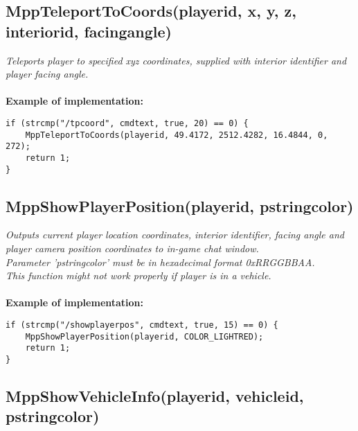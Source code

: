 \documentclass{article}
\begin{document}
\subsection{MppTeleportToCoords(playerid, x, y, z, interiorid, facingangle)}

\textit{Teleports player to specified xyz coordinates, supplied with interior identifier and player facing angle.}
\\
\\
\textbf{Example of implementation:}
\begin{verbatim}
if (strcmp("/tpcoord", cmdtext, true, 20) == 0) {
    MppTeleportToCoords(playerid, 49.4172, 2512.4282, 16.4844, 0, 272);
    return 1;
}
\end{verbatim}


\newpage
\subsection{MppShowPlayerPosition(playerid, pstringcolor)}

\textit{Outputs current player location coordinates, interior identifier, facing angle and player camera position coordinates to in-game chat window.
\\Parameter 'pstringcolor' must be in hexadecimal format 0xRRGGBBAA.
\\This function might not work properly if player is in a vehicle.}
\\
\\
\textbf{Example of implementation:}
\begin{verbatim}
if (strcmp("/showplayerpos", cmdtext, true, 15) == 0) {
    MppShowPlayerPosition(playerid, COLOR_LIGHTRED);
    return 1;
}
\end{verbatim}


\subsection{MppShowVehicleInfo(playerid, vehicleid, pstringcolor)}
\end{document}
